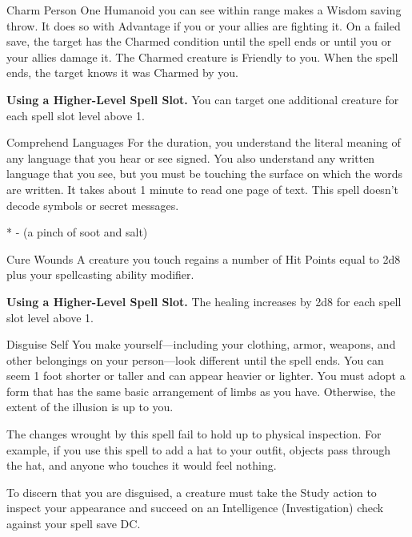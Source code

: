 

\pagestyle{empty}

\begin{Spell}[
    level=1st,
    time=1 Action,
    range=30 ft.,
    components={V, S},
    duration=1 Hour,
    school=Enchantment,
    attack=WIS Save,
    effect=Charmed
]{Charm Person}
One Humanoid you can see within range makes a Wisdom saving throw. It does so with Advantage if you or your allies are fighting it. On a failed save, the target has the Charmed condition until the spell ends or until you or your allies damage it. The Charmed creature is Friendly to you. When the spell ends, the target knows it was Charmed by you.

\textbf{Using a Higher-Level Spell Slot.} You can target one additional creature for each spell slot level above 1.
\end{Spell}


\begin{Spell}[
    level=1st,
    time=1 Action,
    range=Self,
    components={V, S, M*},
    duration=1 Hour,
    school=Divination,
    attack=None,
    effect=Social
  ]{Comprehend Languages}
For the duration, you understand the literal meaning of any language that you hear or see signed. You also understand any written language that you see, but you must be touching the surface on which the words are written. It takes about 1 minute to read one page of text. This spell doesn’t decode symbols or secret messages.

* - (a pinch of soot and salt)
\end{Spell}


\begin{Spell}[
    level=1st,
    time=1 Action,
    range=Touch,
    components={V, S},
    duration=Instantaneous,
    school=Abjuration,
    attack=None,
    effect=Healing
  ]{Cure Wounds}
A creature you touch regains a number of Hit Points equal to 2d8 plus your spellcasting ability modifier.

\textbf{Using a Higher-Level Spell Slot.} The healing increases by 2d8 for each spell slot level above 1.
\end{Spell}


\begin{Spell}[
    level=1st,
    time=1 Action,
    range=Self,
    components={V, S},
    duration=1 Hour,
    school=Illusion,
    attack=None,
    effect=Shapechanging
]{Disguise Self}
You make yourself—including your clothing, armor, weapons, and other belongings on your person—look different until the spell ends. You can seem 1 foot shorter or taller and can appear heavier or lighter. You must adopt a form that has the same basic arrangement of limbs as you have. Otherwise, the extent of the illusion is up to you.

The changes wrought by this spell fail to hold up to physical inspection. For example, if you use this spell to add a hat to your outfit, objects pass through the hat, and anyone who touches it would feel nothing.

To discern that you are disguised, a creature must take the Study action to inspect your appearance and succeed on an Intelligence (Investigation) check against your spell save DC.
\end{Spell}


